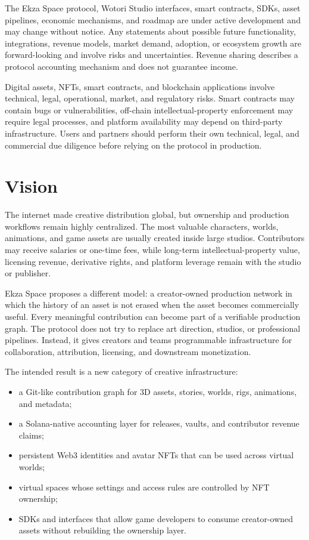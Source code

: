 \documentclass[10pt,twocolumn]{article}
\begin{document}
The Ekza Space protocol, Wotori Studio interfaces, smart contracts, SDKs, asset pipelines, economic mechanisms, and roadmap are under active development and may change without notice. Any statements about possible future functionality, integrations, revenue models, market demand, adoption, or ecosystem growth are forward-looking and involve risks and uncertainties. Revenue sharing describes a protocol accounting mechanism and does not guarantee income.

Digital assets, NFTs, smart contracts, and blockchain applications involve technical, legal, operational, market, and regulatory risks. Smart contracts may contain bugs or vulnerabilities, off-chain intellectual-property enforcement may require legal processes, and platform availability may depend on third-party infrastructure. Users and partners should perform their own technical, legal, and commercial due diligence before relying on the protocol in production.

\section{Vision}
The internet made creative distribution global, but ownership and production workflows remain highly centralized. The most valuable characters, worlds, animations, and game assets are usually created inside large studios. Contributors may receive salaries or one-time fees, while long-term intellectual-property value, licensing revenue, derivative rights, and platform leverage remain with the studio or publisher.

Ekza Space proposes a different model: a creator-owned production network in which the history of an asset is not erased when the asset becomes commercially useful. Every meaningful contribution can become part of a verifiable production graph. The protocol does not try to replace art direction, studios, or professional pipelines. Instead, it gives creators and teams programmable infrastructure for collaboration, attribution, licensing, and downstream monetization.

The intended result is a new category of creative infrastructure:
\begin{itemize}
    \item a Git-like contribution graph for 3D assets, stories, worlds, rigs, animations, and metadata;
    \item a Solana-native accounting layer for releases, vaults, and contributor revenue claims;
    \item persistent Web3 identities and avatar NFTs that can be used across virtual worlds;
    \item virtual spaces whose settings and access rules are controlled by NFT ownership;
    \item SDKs and interfaces that allow game developers to consume creator-owned assets without rebuilding the ownership layer.
\end{itemize}
\end{document}

